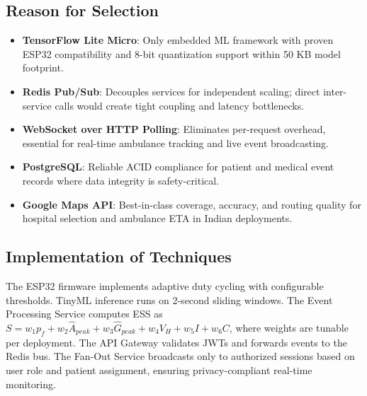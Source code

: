 \subsection{Reason for Selection}

\begin{itemize}
\item \textbf{TensorFlow Lite Micro}: Only embedded ML framework with proven ESP32 compatibility and 8-bit quantization support within 50 KB model footprint.
\item \textbf{Redis Pub/Sub}: Decouples services for independent scaling; direct inter-service calls would create tight coupling and latency bottlenecks.
\item \textbf{WebSocket over HTTP Polling}: Eliminates per-request overhead, essential for real-time ambulance tracking and live event broadcasting.
\item \textbf{PostgreSQL}: Reliable ACID compliance for patient and medical event records where data integrity is safety-critical.
\item \textbf{Google Maps API}: Best-in-class coverage, accuracy, and routing quality for hospital selection and ambulance ETA in Indian deployments.
\end{itemize}

\subsection{Implementation of Techniques}

The ESP32 firmware implements adaptive duty cycling with configurable thresholds. TinyML inference runs on 2-second sliding windows. The Event Processing Service computes ESS as $S = w_1 p_f + w_2 \hat{A}_{peak} + w_3 \hat{G}_{peak} + w_4 V_H + w_5 I + w_6 C$, where weights are tunable per deployment. The API Gateway validates JWTs and forwards events to the Redis bus. The Fan-Out Service broadcasts only to authorized sessions based on user role and patient assignment, ensuring privacy-compliant real-time monitoring.
